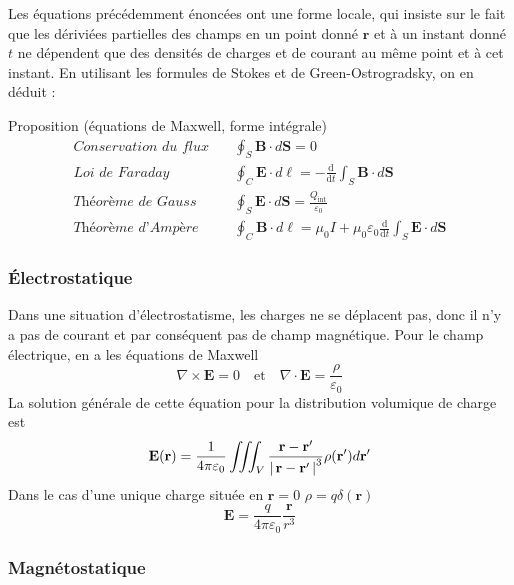        Les équations précédemment énoncées ont une forme locale, qui insiste sur le fait que les dériviées partielles des champs en un point donné $\mathbf{r}$ et à un instant donné $t$ ne dépendent que des densités de charges et de courant au même point et à cet instant. En utilisant les formules de Stokes et de Green-Ostrogradsky, on en déduit :

        \begin{omed}{Proposition (équations de Maxwell, forme intégrale)}
            \begin{align*}
                \textit{Conservation du flux} \quad & \oint_S \mathbf{B} \cdot d\mathbf{S} = 0 \\
                \textit{Loi de Faraday} \quad & \oint_C \mathbf{E} \cdot d\ell = - \frac{\text{d}}{\text{d}t} \int_{S} \mathbf{B} \cdot d\mathbf{S} \\
                \textit{Théorème de Gauss} \quad  & \oint_{S} \mathbf{E} \cdot d\mathbf{S} = \frac{Q_{\text{int}}}{\varepsilon_0} \\
                \textit{Théorème d’Ampère} \quad & \oint_C \mathbf{B} \cdot d\ell = \mu_0 I + \mu_0 \varepsilon_0 \frac{\text{d}}{\text{d}t} \int_S \mathbf{E} \cdot d\mathbf{S}
            \end{align*}
        \end{omed}

        \subsubsection{Électrostatique}

        Dans une situation d’électrostatisme, les charges ne se déplacent pas, donc il n’y a pas de courant et par conséquent pas de champ magnétique. Pour le champ électrique, en a les équations de Maxwell 
        \[ \nabla \times \mathbf{E} = 0 \quad \text{et} \quad  \nabla \cdot \mathbf{E} = \frac{\rho}{\varepsilon_0} \]    
        La solution générale de cette équation pour la distribution volumique de charge est 
        \[ \mathbf{E}(\mathbf{r}) = \frac{1}{4 \pi \varepsilon_0} \iiint_V \frac{\mathbf{r} - \mathbf{r}'}{\left\lvert \, \mathbf{r} - \mathbf{r}' \, \right\rvert^3} \rho(\mathbf{r}') d\mathbf{r}' \]
        Dans le cas d’une unique charge située en $\mathbf{r} = 0$ $\rho = q \delta(\mathbf{r})$
        \[ \mathbf{E} = \frac{q}{4 \pi \varepsilon_0} \frac{\mathbf{r}}{r^3} \]   

        \subsubsection{Magnétostatique}

